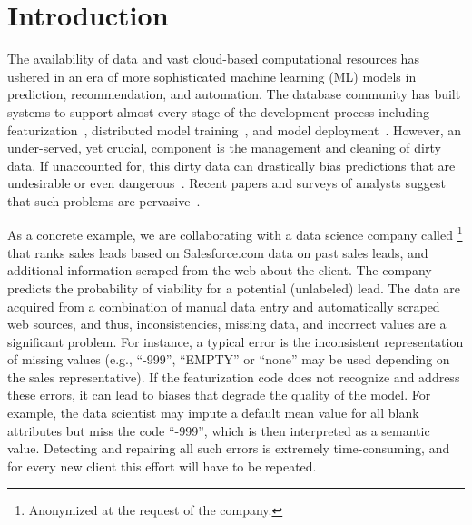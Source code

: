\section{Introduction}\label{intro}\sloppy
The availability of data and vast cloud-based computational resources has ushered in an era of more sophisticated machine learning (ML) models in prediction, recommendation, and automation.
The database community has built systems to support almost every stage of the development process including featurization~\cite{keystone,zhang2014mat}, distributed model training~\cite{hellerstein2012madlib, crotty2014tupleware, feng2012towards, tensor}, and model deployment~\cite{crankshawmissing}.  
However, an under-served, yet crucial, component is the management and cleaning of dirty data. 
 If unaccounted for, this dirty data can drastically bias predictions that are undesirable or even dangerous~\cite{vanderbilt2012let}.  Recent papers and surveys of analysts suggest that such problems are pervasive~\cite{sculley2014machine,kandel2012,krishnan2016hilda}.

As a concrete example, we are collaborating with a data science company called \company\footnote{Anonymized at the request of the company.} that ranks sales leads based on Salesforce.com data on past sales leads, and additional information scraped from the web about the client.
The company predicts the probability of viability for a potential (unlabeled) lead.
The data are acquired from a combination of manual data entry and automatically scraped web sources, and thus, inconsistencies, missing data, and incorrect values are a significant problem.  For instance, a typical error is the inconsistent representation of missing values (e.g., ``-999'', ``EMPTY'' or ``none'' may be used depending on the sales representative).  If the featurization code does not recognize and address these errors, it can lead to biases that degrade the quality of the model. For example, the data scientist may impute a default mean value for all blank attributes but miss the code ``-999'', which is then interpreted as a semantic value. 
Detecting and repairing all such errors is extremely time-consuming, and for every new client this effort will have to be repeated.

